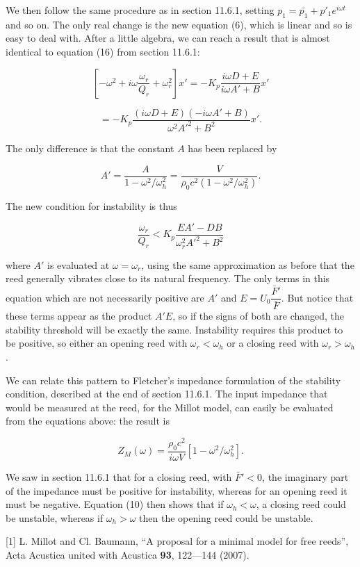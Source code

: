   We then follow the same procedure as in section 11.6.1, setting 
  $p_1=\bar{p_1}+ p'_1 e^{i \omega t}$ and so on. The only real change is the 
  new equation (6), which is linear and so is easy to deal with. After a little 
  algebra, we can reach a result that is almost identical to equation (16) from 
  section 11.6.1: 

  $$\left[ -\omega^2 + i \omega \dfrac{\omega_r}{Q_r} + \omega_r^2 \right]x' = 
  -K_p \dfrac{i \omega D + E}{i \omega A' + B} x'$$ 

  $$=-K_p \dfrac{(i \omega D + E)(-i \omega A' + B)}{\omega^2 A'^2 + B^2} x' . 
  \tag{7}$$ 

  The only difference is that the constant $A$ has been replaced by 

  $$A'=\dfrac{A}{1-\omega^2/\omega_h^2}=\dfrac{V}{\rho_0 c^2 
  (1-\omega^2/\omega_h^2)} . \tag{8}$$ 

  The new condition for instability is thus 

  $$\dfrac{\omega_r}{Q_r} < K_p\dfrac{EA'-DB}{\omega_r^2 A'^2 + B^2} \tag{9}$$ 

  where $A'$ is evaluated at $\omega=\omega_r$, using the same approximation as 
  before that the reed generally vibrates close to its natural frequency. The 
  only terms in this equation which are not necessarily positive are $A'$ and 
  $E=U_0 \dfrac{\bar{F}'}{\bar{F}}$. But notice that these terms appear as the 
  product $A'E$, so if the signs of both are changed, the stability threshold 
  will be exactly the same. Instability requires this product to be positive, 
  so either an opening reed with $\omega_r < \omega_h$ or a closing reed with 
  $\omega_r > \omega_h$. 

  We can relate this pattern to Fletcher's impedance formulation of the 
  stability condition, described at the end of section 11.6.1. The input 
  impedance that would be measured at the reed, for the Millot model, can 
  easily be evaluated from the equations above: the result is 

  $$Z_M(\omega) = \dfrac{\rho_0 c^2}{i \omega 
  V}\left[1-\omega^2/\omega_h^2\right] .\tag{10}$$ 

  We saw in section 11.6.1 that for a closing reed, with $\bar{F}' < 0$, the 
  imaginary part of the impedance must be positive for instability, whereas for 
  an opening reed it must be negative. Equation (10) then shows that if 
  $\omega_h < \omega$, a closing reed could be unstable, whereas if $\omega_h > 
  \omega$ then the opening reed could be unstable. 

  \sectionreferences{}[1] L. Millot and Cl. Baumann, “A proposal for a minimal 
  model for free reeds”, Acta Acustica united with Acustica \textbf{93}, 
  122—144 (2007). 